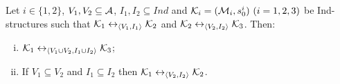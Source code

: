 \documentclass[letterpaper]{article} %
\begin{document}
\begin{proposition}\label{pro:VI:div}
Let $i\in \{1,2\}$, $V_1,V_2\subseteq\cal A$, $I_1, I_2 \subseteq Ind$
and ${\cal K}_i=({\cal M}_i,s_0^i)~(i=1,2,3)$ be Ind-structures
 such that
${\cal K}_1\leftrightarrow_{{\langle{V_1, I_1}\rangle}}{\cal K}_2$ and ${\cal K}_2\leftrightarrow_{{\langle{V_2,I_2}\rangle}}{\cal K}_3$.
 Then:
 \begin{enumerate}[(i)]
   \item ${\cal K}_1\leftrightarrow_{{\langle{V_1\cup V_2, I_1 \cup I_2}\rangle}}{\cal K}_3$;
   \item If $V_1 \subseteq V_2$ and $I_1 \subseteq I_2$ then ${\cal K}_1 \leftrightarrow_{{\langle{V_2, I_2}\rangle}} {\cal K}_2$.
 \end{enumerate}
\end{proposition}
%


\end{document}
